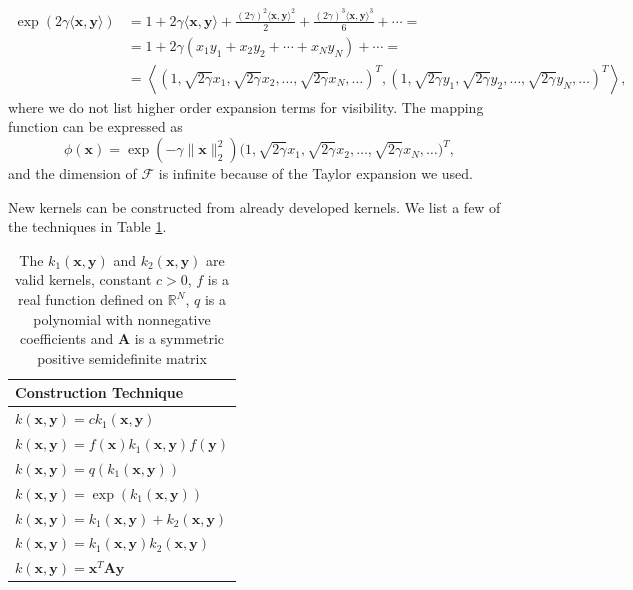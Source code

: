 \documentclass[11pt,oneside,czech,american]{book} %
\theoremstyle{definition} %
\theoremstyle{definition}
\begin{document}
\begin{equation}
	\begin{aligned}
		\exp(2\gamma \langle \bm{x}, \bm{y} \rangle ) &= 1 + 2\gamma \langle \bm{x}, \bm{y} \rangle + \frac{(2\gamma)^2 \langle \bm{x}, \bm{y} \rangle^2}{2} + \frac{(2\gamma)^3 \langle \bm{x}, \bm{y} \rangle^3}{6} + \cdots = \\
		&= 1 + 2\gamma (x_1 y_1 + x_2 y_2 + \cdots + x_N y_N)  + \cdots = \\
		&= \left\langle( 1, \sqrt{2\gamma} x_1, \sqrt{2\gamma} x_2, \dots, \sqrt{2\gamma} x_N, \dots )^T, ( 1, \sqrt{2\gamma} y_1, \sqrt{2\gamma} y_2, \dots, \sqrt{2\gamma} y_N, \dots )^T \right\rangle,
	\end{aligned}
\end{equation}
where we do not list higher order expansion terms for visibility. The mapping function can be expressed as
\begin{equation}
	\phi(\bm{x}) = \exp(-\gamma \|\bm{x} \|^2_2)\Big( 1, \sqrt{2\gamma} x_1, \sqrt{2\gamma} x_2, \dots, \sqrt{2\gamma} x_N, \dots \Big)^T,
\end{equation}
and the dimension of $\mathcal{F}$ is infinite because of the Taylor expansion we used.

New kernels can be constructed from already developed kernels. We list a few of the techniques in Table \ref{techniques}.

\begin{table}[H]
	\centering
	\begin{tabular}{l} 
		\hline
		Construction Technique  \\ 
		\hline
		$k(\bm{x}, \bm{y}) = c k_1(\bm{x}, \bm{y})$   \\
		$k(\bm{x}, \bm{y}) = f(\bm{x})k_1(\bm{x}, \bm{y}) f(\bm{y})$  \\
		$k(\bm{x}, \bm{y}) = q(k_1(\bm{x}, \bm{y}))$   \\
		$k(\bm{x}, \bm{y}) = \exp(k_1(\bm{x}, \bm{y}))$    \\
		$k(\bm{x}, \bm{y}) = k_1(\bm{x}, \bm{y}) + k_2(\bm{x}, \bm{y})$  \\
		$k(\bm{x}, \bm{y}) = k_1(\bm{x}, \bm{y}) k_2(\bm{x}, \bm{y})$\\
		$k(\bm{x}, \bm{y}) = \bm{x}^T \bm{A} \bm{y}$                     \\
		\hline
	\end{tabular}
	\caption{The $k_1(\bm{x}, \bm{y})$ and $k_2(\bm{x}, \bm{y})$ are valid kernels, constant $c>0$, $f$ is a real function defined on $\mathbb{R}^N$, $q$ is a polynomial with nonnegative coefficients and $\bm{A}$ is a symmetric positive semidefinite matrix}
	\label{techniques}
\end{table}
\end{document}
